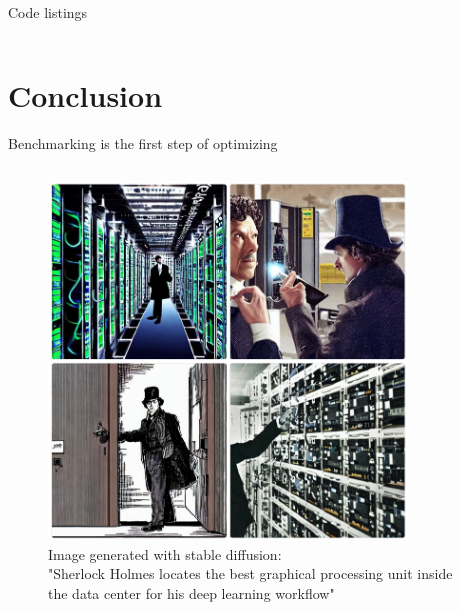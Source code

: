 \documentclass[compress,aspectratio=169]{beamer}
\begin{document}
\begin{frame}[fragile]{Code listings}
        \footnotesize\inputminted[xleftmargin=1em,linenos,fontsize=\tiny, firstline=33,lastline=48, breaklines]{python}{../../data/scap_gtx1080_deepspeed_14615344_4294967294_one-epoch.txt}

\end{frame}


\section{Conclusion}
\begin{frame}{Benchmarking is the first step of optimizing}
\label{pg:lastpage} %

\begin{columns}
        \begin{column}{0.5\textwidth}
            \centering
            \vspace{-1em}
            \begin{figure}
            \includegraphics[width=0.85\textwidth]{assets/Sherlock-Holmes-locates-the-best-graphical-processing-unit-inside-the-data-center-for-his-deep-learning-workflow}
            \caption*{Image generated with stable diffusion: \\
            \tiny{"Sherlock Holmes locates the best graphical processing unit inside the data center for his deep learning workflow"}}
            \end{figure}

\end{column}
\end{columns}
\end{frame}
\end{document}
